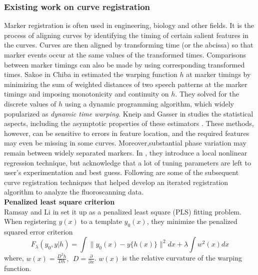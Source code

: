 \subsubsection*{Existing work on curve registration} \label{ch3_registration}
Marker registration is often used in engineering, biology and other fields. It is the process of aligning curves by identifying the timing of certain salient features in the curves. Curves are then aligned by transforming time (or the abcissa) so that marker events occur at the same values of the transformed times. Comparisons between marker timings can also be made by using corresponding transformed times. Sakoe in Chiba in \cite{Sakoe_Chiba_1978_IEEE} estimated the warping function $h$ at marker timings by minimizing the sum of weighted distances of two speech patterns at the marker timings and imposing monotonicity and continuity on $h$. They solved for the discrete values of $h$ using a dynamic programming algorithm, which widely popularized as {\emph{dynamic time warping}}. Kneip and Gasser in \cite{Kneip_Gasser_1992_AnnStat} studies the statistical aspects, including the asymptotic properties of these estimators \cite{Kneip_etal_2000_CJS}. These methods, however, can be sensitive to errors in feature location, and the  required features may even be missing in some curves. Moreover,substantial phase variation may remain between widely separated markers. In \cite{Kneip_etal_2000_CJS}, they introduce a local nonlinear regression technique, but acknowledge that a lot of tuning parameters are left to user's experimentation and best guess. Following are some of the subsequent curve registration techniques that helped develop an iterated registration algorithm to analyze the fluoroscanning data. \\

\noindent
{\bf{Penalized least square criterion}} \\
Ramsay and Li in \cite{Ramsay_Li_1998_JRSSB} set it up as a penalized least square (PLS) fitting problem. When registering $y(x)$ to a template $y_0(x)$, they minimize the penalized squared error criterion
\[ F_{\lambda}(y_0, y|h) = \displaystyle \int \| y_0(x) - y\{h(x)\} \|^2 dx + \lambda \displaystyle \int w^2(x)dx\]
where, $w(x) = \frac{D^2h}{Dh},\ \ D = \frac{\partial}{\partial x}$. $w(x)$ is the relative curvature of the warping function.\\

